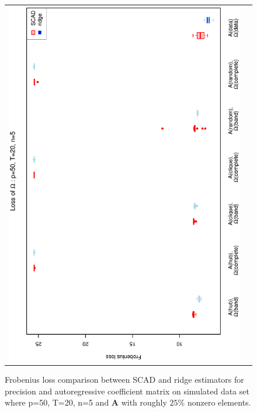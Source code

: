 \begin{figure}[h!]
\begin{tabular}{cc}
\includegraphics[scale=0.45,angle=270]{LossOmega50T20N5_25.eps}
\end{tabular}
\caption{Frobenius loss comparison between SCAD and ridge estimators for precision and autoregressive coefficient matrix on simulated data set where p=50, T=20, n=5 and $\mathbf{A}$ with roughly $25\%$ nonzero elements.}
\label{figSM:Loss50T20N5_25}
\end{figure}


